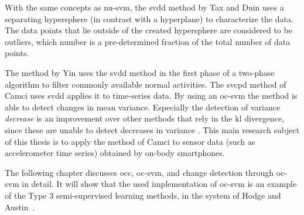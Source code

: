 With the same concepts as \gls{nu-svm}, the \gls{svdd} method by Tax and Duin \cite{tax1999support,tax2004support} uses a separating hypersphere (in contrast with a hyperplane) to characterize the data.
The data points that lie outside of the created hypersphere are considered to be outliers, which number is a pre-determined fraction of the total number of data points.

The method by Yin \etal \cite{yin2008sensor} uses the \gls{svdd} method in the first phase of a two-phase algorithm to filter commonly available normal activities.
The \gls{svcpd} method of Camci \cite{camci2010change} uses \gls{svdd} applies it to time-series data.
By using an \gls{oc-svm} the method is able to detect changes in mean variance.
Especially the detection of variance \emph{decrease} is an improvement over other methods that rely in the \gls{kl} divergence, since these are unable to detect decreases in variance \cite{takeuchi2006unifying}.
This main research subject of this thesis is to apply the method of Camci \cite{camci2010change} to sensor data (such as accelerometer time series) obtained by on-body smartphones.

The following chapter discusses \gls{occ}, \gls{oc-svm}, and change detection through \gls{oc-svm} in detail.
It will show that the used implementation of \gls{oc-svm} is an example of the Type 3 semi-supervised learning methods, in the system of Hodge and Austin~\cite{hodge2004survey}.



